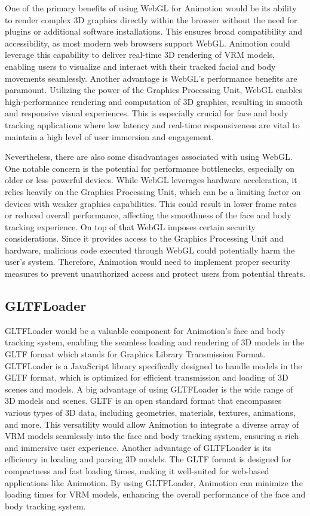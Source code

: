 One of the primary benefits of using WebGL for Animotion would be its ability to render complex 3D graphics directly 
within the browser without the need for plugins or additional software installations. This ensures broad 
compatibility and accessibility, as most modern web browsers support WebGL. Animotion could leverage this 
capability to deliver real-time 3D rendering of VRM models, enabling users to visualize and interact 
with their tracked facial and body movements seamlessly. Another advantage is WebGL's performance benefits are paramount. 
Utilizing the power of the Graphics Processing Unit, WebGL 
enables high-performance rendering and computation of 3D graphics, resulting in smooth and responsive visual 
experiences. This is especially crucial for face and body tracking applications where low latency and real-time 
responsiveness are vital to maintain a high level of user immersion and engagement. \cite{WebGLAdvantages}

Nevertheless, there are also some disadvantages associated with using WebGL. One notable concern is the potential for performance bottlenecks, 
especially on older or less powerful devices. While WebGL leverages hardware acceleration, it relies heavily on the Graphics Processing Unit, 
which can be a limiting factor on devices with weaker graphics capabilities. This could result in lower frame rates or reduced 
overall performance, affecting the smoothness of the face and body tracking experience. 
On top of that WebGL imposes certain security considerations. Since it provides access to the Graphics Processing Unit and hardware, 
malicious code executed through WebGL could potentially harm the user's system. Therefore, 
Animotion would need to implement proper security measures to prevent unauthorized access and protect users from potential threats. \cite{WebGLSecurity}

\subsection{GLTFLoader}
GLTFLoader would be a valuable component for Animotion's face and body tracking system, enabling the seamless loading 
and rendering of 3D models in the GLTF format which stands for Graphics Library Transmission Format. GLTFLoader is a JavaScript library specifically designed to handle 
models in the GLTF format, which is optimized for efficient transmission 
and loading of 3D scenes and models. 
A big advantage of using GLTFLoader is the wide range of 3D models and scenes. 
GLTF is an open standard format that encompasses various types of 3D data, including geometries, materials, textures, 
animations, and more. This versatility would allow Animotion to integrate a diverse array of VRM models seamlessly 
into the face and body tracking system, ensuring a rich and immersive user experience.
Another advantage of GLTFLoader is its efficiency in loading and parsing 3D models. The GLTF format is designed 
for compactness and fast loading times, making it well-suited for web-based applications like Animotion. 
By using GLTFLoader, Animotion can minimize the loading times for VRM models, enhancing 
the overall performance of the face and body tracking system. \cite{GLTFLoader}

